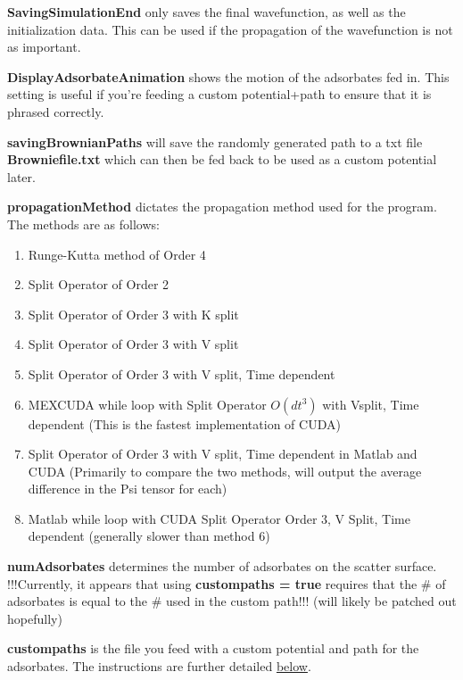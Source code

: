 \documentclass[11pt,letterpaper]{article}
\renewcommand{\\}{\bigskip}
\begin{document}
\textbf{SavingSimulationEnd} only saves the final wavefunction, as well as the initialization data. This can be used if the propagation of the wavefunction is not as important.\\

\textbf{DisplayAdsorbateAnimation} shows the motion of the adsorbates fed in. This setting is useful if you're feeding a custom potential+path to ensure that it is phrased correctly.\\

\textbf{savingBrownianPaths} will save the randomly generated path to a txt file \textbf{Browniefile.txt} which can then be fed back to be used as a custom potential later.\\

\textbf{propagationMethod} dictates the propagation method used for the program. The methods are as follows:

\begin{enumerate}
    \item Runge-Kutta method of Order 4
    \item Split Operator of Order 2
    \item Split Operator of Order 3 with K split
    \item Split Operator of Order 3 with V split
    \item Split Operator of Order 3 with V split, Time dependent
    \item MEXCUDA while loop with Split Operator $O(dt^3)$ with Vsplit, Time dependent (This is the fastest implementation of CUDA)
    \item Split Operator of Order 3 with V split, Time dependent in Matlab and CUDA (Primarily to compare the two methods, will output the average difference in the Psi tensor for each)
    \item Matlab while loop with CUDA Split Operator Order 3, V Split, Time dependent (generally slower than method 6)
\end{enumerate}

\bigskip

\textbf{numAdsorbates} determines the number of adsorbates on the scatter surface. !!!Currently, it appears that using \textbf{custompaths = true} requires that the \# of adsorbates is equal to the \# used in the custom path!!! (will likely be patched out hopefully)\\

\textbf{custompaths} is the file you feed with a custom potential and path for the adsorbates. The instructions are further detailed \hyperref[sec:custompaths]{below}.\\
\end{document}
